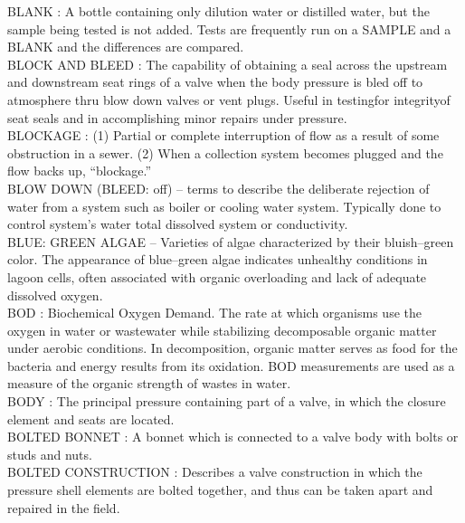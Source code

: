 BLANK :  A bottle containing only dilution water or distilled water, but the sample being tested is not added. Tests are frequently run on a SAMPLE and a BLANK and the differences are compared.\\
\vspace{0.15cm}
BLOCK AND BLEED :   The capability of obtaining a seal across the upstream and downstream seat rings of a valve when the body pressure is bled off to atmosphere thru blow down valves or vent plugs. Useful in testingfor integrityof seat seals and in accomplishing minor repairs under pressure.\\
\vspace{0.15cm}
BLOCKAGE :  (1) Partial or complete interruption of flow as a result of some obstruction in a sewer. (2) When a collection system becomes plugged and the flow backs up, “blockage.” \\
\vspace{0.15cm}
BLOW DOWN (BLEED: off) – terms to describe the deliberate rejection of water from a system such as boiler or cooling water system. Typically done to control system’s water total dissolved system or conductivity.\\
\vspace{0.15cm}
BLUE: GREEN ALGAE – Varieties of algae characterized by their bluish–green color. The appearance of blue–green algae indicates unhealthy conditions in lagoon cells, often associated with organic overloading and lack of adequate dissolved oxygen.\\
\vspace{0.15cm}
BOD :  Biochemical Oxygen Demand. The rate at which organisms use the oxygen in water or wastewater while stabilizing decomposable organic matter under aerobic conditions. In decomposition, organic matter serves as food for the bacteria and energy results from its oxidation. BOD measurements are used as a measure of the organic strength of wastes in water. \\
\vspace{0.15cm}
BODY :   The principal pressure containing part of a valve, in which the closure element and seats are located.\\
\vspace{0.15cm}
BOLTED BONNET :   A bonnet which is connected to a valve body with bolts or studs and nuts.\\
\vspace{0.15cm}
BOLTED CONSTRUCTION :   Describes a valve construction in which the pressure shell elements are bolted together, and thus can be taken apart and repaired in the field.\\
